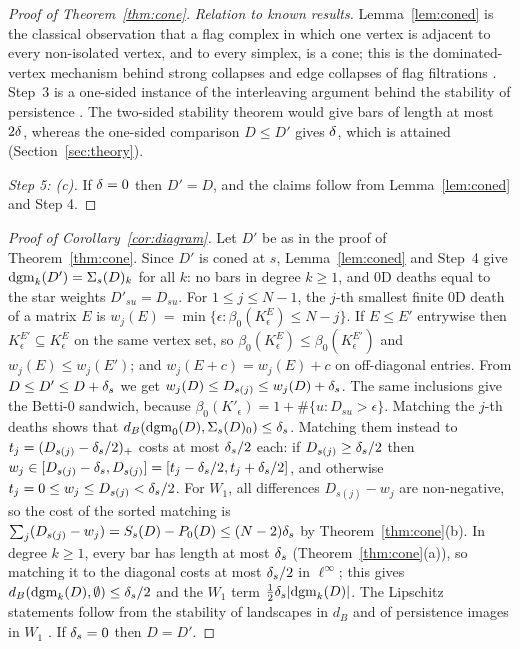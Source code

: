 \begin{proof}[Proof of Theorem~\ref{thm:cone}]
\emph{Relation to known results.} Lemma~\ref{lem:coned} is the classical observation that a flag complex in which one vertex is adjacent to every non-isolated vertex, and to every simplex, is a cone; this is the dominated-vertex mechanism behind strong collapses \citep{barmak2012strong} and edge collapses of flag filtrations \citep{boissonnat2020edge}. Step~3 is a one-sided instance of the interleaving argument behind the stability of persistence \citep{cohensteiner2007stability,chazal2009proximity,chazal2014geometric}. The two-sided stability theorem would give bars of length at most $2\delta$, whereas the one-sided comparison $D\le D'$ gives $\delta$, which is attained (Section~\ref{sec:theory}).

\emph{Step 5: (c).} If $\delta=0$ then $D'=D$, and the claims follow from Lemma~\ref{lem:coned} and Step 4.
\end{proof}

\begin{proof}[Proof of Corollary~\ref{cor:diagram}]
Let $D'$ be as in the proof of Theorem~\ref{thm:cone}. Since $D'$ is coned at $s$, Lemma~\ref{lem:coned} and Step~4 give $\mathrm{dgm}_k(D')=\Sigma_s(D)_k$ for all $k$: no bars in degree $k\ge1$, and $0$D deaths equal to the star weights $D'_{su}=D_{su}$. For $1\le j\le N-1$, the $j$-th smallest finite $0$D death of a matrix $E$ is $w_j(E)=\min\{\epsilon:\beta_0(K^E_\epsilon)\le N-j\}$. If $E\le E'$ entrywise then $K^{E'}_\epsilon\subseteq K^E_\epsilon$ on the same vertex set, so $\beta_0(K^E_\epsilon)\le\beta_0(K^{E'}_\epsilon)$ and $w_j(E)\le w_j(E')$; and $w_j(E+c)=w_j(E)+c$ on off-diagonal entries. From $D\le D'\le D+\delta_s$ we get $w_j(D)\le D_{s(j)}\le w_j(D)+\delta_s$. The same inclusions give the Betti-$0$ sandwich, because $\beta_0(K'_\epsilon)=1+\#\{u:D_{su}>\epsilon\}$. Matching the $j$-th deaths shows that $d_B(\mathrm{dgm}_0(D),\Sigma_s(D)_0)\le\delta_s$. Matching them instead to $t_j=(D_{s(j)}-\delta_s/2)_+$ costs at most $\delta_s/2$ each: if $D_{s(j)}\ge\delta_s/2$ then $w_j\in[D_{s(j)}-\delta_s,D_{s(j)}]=[t_j-\delta_s/2,t_j+\delta_s/2]$, and otherwise $t_j=0\le w_j\le D_{s(j)}<\delta_s/2$. For $W_1$, all differences $D_{s(j)}-w_j$ are non-negative, so the cost of the sorted matching is $\sum_j(D_{s(j)}-w_j)=S_s(D)-P_0(D)\le(N-2)\delta_s$ by Theorem~\ref{thm:cone}(b). In degree $k\ge1$, every bar has length at most $\delta_s$ (Theorem~\ref{thm:cone}(a)), so matching it to the diagonal costs at most $\delta_s/2$ in $\ell^\infty$; this gives $d_B(\mathrm{dgm}_k(D),\emptyset)\le\delta_s/2$ and the $W_1$ term $\tfrac12\delta_s|\mathrm{dgm}_k(D)|$. The Lipschitz statements follow from the stability of landscapes in $d_B$ \citep{bubenik2015landscapes} and of persistence images in $W_1$ \citep{adams2017persistence}. If $\delta_s=0$ then $D=D'$.
\end{proof}

